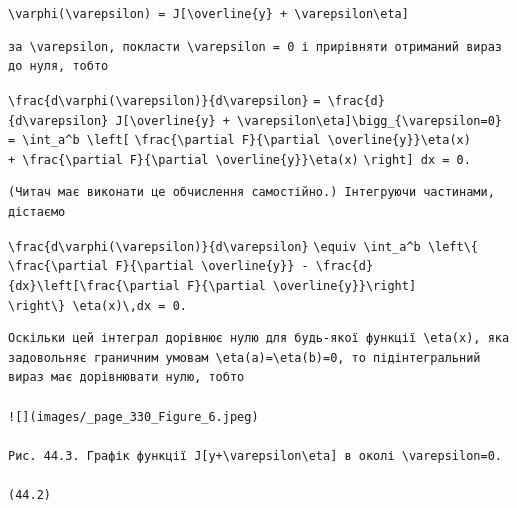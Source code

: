 \documentclass[
  ukrainian,
]{article}
\begin{document}
\texttt{\textbackslash{}varphi(\textbackslash{}varepsilon)\ =\ J{[}\textbackslash{}overline\{y\}\ +\ \textbackslash{}varepsilon\textbackslash{}eta{]}}

\begin{verbatim}
за \varepsilon, покласти \varepsilon = 0 і прирівняти отриманий вираз до нуля, тобто
\end{verbatim}

\texttt{\textbackslash{}frac\{d\textbackslash{}varphi(\textbackslash{}varepsilon)\}\{d\textbackslash{}varepsilon\}}
\texttt{=\ \textbackslash{}frac\{d\}\{d\textbackslash{}varepsilon\}\ J{[}\textbackslash{}overline\{y\}\ +\ \textbackslash{}varepsilon\textbackslash{}eta{]}\textbackslash{}bigg\textbar{}\_\{\textbackslash{}varepsilon=0\}}
\texttt{=\ \textbackslash{}int\_a\^{}b\ \textbackslash{}left{[}}
\texttt{\textbackslash{}frac\{\textbackslash{}partial\ F\}\{\textbackslash{}partial\ \textbackslash{}overline\{y\}\}\textbackslash{}eta(x)}
\texttt{+\ \textbackslash{}frac\{\textbackslash{}partial\ F\}\{\textbackslash{}partial\ \textbackslash{}overline\{y\textquotesingle{}\}\}\textbackslash{}eta\textquotesingle{}(x)}
\texttt{\textbackslash{}right{]}\ dx\ =\ 0.}

\begin{verbatim}
(Читач має виконати це обчислення самостійно.) Інтегруючи частинами, дістаємо
\end{verbatim}

\texttt{\textbackslash{}frac\{d\textbackslash{}varphi(\textbackslash{}varepsilon)\}\{d\textbackslash{}varepsilon\}}
\texttt{\textbackslash{}equiv\ \textbackslash{}int\_a\^{}b\ \textbackslash{}left\textbackslash{}\{}
\texttt{\textbackslash{}frac\{\textbackslash{}partial\ F\}\{\textbackslash{}partial\ \textbackslash{}overline\{y\}\}\ -\ \textbackslash{}frac\{d\}\{dx\}\textbackslash{}left{[}\textbackslash{}frac\{\textbackslash{}partial\ F\}\{\textbackslash{}partial\ \textbackslash{}overline\{y\textquotesingle{}\}\}\textbackslash{}right{]}}
\texttt{\textbackslash{}right\textbackslash{}\}\ \textbackslash{}eta(x)\textbackslash{},dx\ =\ 0.}

\begin{verbatim}
Оскільки цей інтеграл дорівнює нулю для будь-якої функції \eta(x), яка задовольняє граничним умовам \eta(a)=\eta(b)=0, то підінтегральний вираз має дорівнювати нулю, тобто

![](images/_page_330_Figure_6.jpeg)

Рис. 44.3. Графік функції J[y+\varepsilon\eta] в околі \varepsilon=0.

(44.2)
\end{verbatim}
\end{document}
